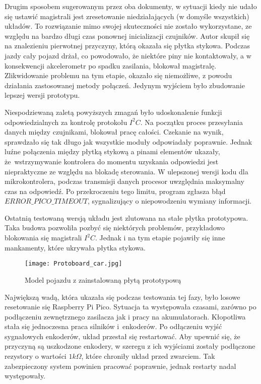         Drugim sposobem sugerowanym przez oba dokumenty,
        w sytuacji kiedy nie udało się ustawić magistrali jest zresetowanie niedziałających (w domyśle wszystkich) układów.
        To rozwiązanie mimo swojej skuteczności nie zostało wykorzystane,
        ze względu na bardzo długi czas ponownej inicializacji czujników.
        Autor skupił się na znalezieniu pierwotnej przyczyny, którą okazała się płytka stykowa.
        Podczas jazdy cały pojazd drżał, co powodowało, że niektóre piny nie kontaktowały,
        a w konsekwencji akcelerometr po spadku zasilania, blokował magistralę.
        Zlikwidowanie problemu na tym etapie, okazało się niemożliwe, z powodu działania zastosowanej metody połączeń.
        Jedynym wyjściem było zbudowanie lepszej wersji prototypu.

        Niespodziewaną zaletą powyższych zmagań było udoskonalenie funkcji odpowiedzialnych za kontrolę protokołu $I^2C$.
        Na początku proces przesyłania danych między czujnikami, blokował pracę całości.
        Czekanie na wynik, sprawdzało się tak długo jak wszystkie moduły odpowiadały poprawnie.
        Jednak luźne połączenia między płytką stykową a pinami elementów ukazały,
        że~wstrzymywanie kontrolera do momentu uzyskania odpowiedzi jest niepraktyczne ze względu na blokadę sterowania.
        W ulepszonej wersji kodu dla mikrokontrolera, podczas transmisji danych procesor uwzględnia maksymalny czas na odpowiedź.
        Po przekroczeniu tego limitu, program zgłasza błąd $ERROR\_PICO\_TIMEOUT$, sygnalizujący o niepowodzeniu wymiany informacji.

        Ostatnią testowaną wersją układu jest zlutowana na stałe płytka prototypowa.
        Taka budowa pozwoliła pozbyć się niektórych problemów, przykładowo blokowania się magistrali $I^2C$.
        Jednak i na tym etapie pojawiły się inne mankamenty, które ukrywała płytka stykowa.
        \begin{figure}[!ht]
            \centering
            \texttt{[image: Protoboard\_car.jpg]}
            \caption{Model pojazdu z zainstalowaną płytą prototypową}
            \label{fig:protoboard_car}
        \end{figure}

        Największą wadą, która ukazała się podczas testowania tej fazy, było losowe resetowanie się Raspberry Pi Pico.
        Sytuacja ta występowała czasami, zarówno po podłączeniu zewnętrznego zasilacza jak i pracy na akumulatorach.
        Kłopotliwa stała się jednoczesna praca silników i~enkoderów.
        Po odłączeniu wyjść sygnałowych enkoderów, układ przestał się restartować.
        Aby upewnić się, że przyczyną są uszkodzone enkodery, w szeregu z ich wyjściami zostały podłączone rezystory o wartości $1k\Omega$, które chroniły układ przed zwarciem.
        Tak zabezpieczony system powinien pracować poprawnie, jednak restarty nadal występowały.

